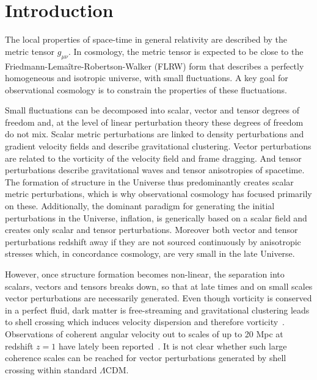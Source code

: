 \documentclass[a4paper,twocolumn,aps,prd,nolongbibliography,superscriptaddress,showpacs,showkeys,amsmath,amssymb,floatfix,nofootinbib]{revtex4-1}
\renewcommand{\[}{\begin{equation}}
\renewcommand{\]}{\end{equation}}
\begin{document}
\section{Introduction}

The local properties of space-time in general relativity are described by the metric tensor $g_{\mu\nu}$. In cosmology, the metric tensor is expected to be close to the Friedmann-Lema\^itre-Robertson-Walker (FLRW) form that describes a perfectly homogeneous and isotropic universe, with small fluctuations. A key goal for observational cosmology is to constrain the properties of these fluctuations.

Small fluctuations can be decomposed into scalar, vector and tensor degrees of freedom and, at the level of linear perturbation theory these degrees of freedom do not mix. Scalar metric perturbations are linked to density perturbations and gradient velocity fields and describe gravitational clustering. Vector perturbations are related to the vorticity of the velocity field and frame dragging. And tensor perturbations describe gravitational waves and tensor anisotropies of spacetime. The formation of structure in the Universe thus predominantly creates scalar metric perturbations, which is why observational cosmology has focused primarily on these. Additionally, the dominant paradigm for generating the initial perturbations in the Universe, inflation, is generically based on a scalar field and creates only scalar and tensor perturbations. Moreover both vector and tensor perturbations redshift away if they are not sourced continuously by anisotropic stresses which, in concordance cosmology, are very small in the late Universe.

However, once structure formation becomes non-linear, the separation into scalars, vectors and tensors breaks down, so that at late times and on small scales vector perturbations are necessarily generated. Even though vorticity is conserved in a perfect fluid, dark matter is free-streaming and gravitational clustering leads to shell crossing which induces velocity dispersion and therefore vorticity~\cite{Aviles:2015osc,Piattella:2015nda,Cusin:2016zvu}. Observations of coherent angular velocity out to scales of up to 20 Mpc at redshift $z=1$ have lately been reported~\cite{Taylor:2016rsd}. It is not clear whether such large coherence scales can be reached for vector perturbations generated by shell crossing within standard $\Lambda$CDM.
\end{document}
